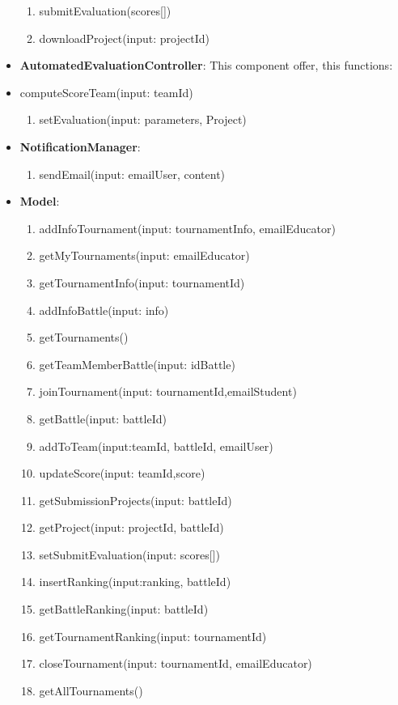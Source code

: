 \begin{itemize}
\begin{enumerate}
    \item submitEvaluation(scores[])
    \item downloadProject(input: projectId)
\end{enumerate}
\item \textbf{AutomatedEvaluationController}: This component offer,  this functions:
    \item computeScoreTeam(input: teamId)
\begin{enumerate}
    \item setEvaluation(input: parameters, Project)
\end{enumerate}
\item \textbf{NotificationManager}:
\begin{enumerate}
    \item sendEmail(input: emailUser, content)
\end{enumerate}
\item  \textbf{Model}:
\begin{enumerate}
    \item addInfoTournament(input: tournamentInfo, emailEducator)
    \item getMyTournaments(input: emailEducator)
    \item getTournamentInfo(input: tournamentId)
    \item addInfoBattle(input: info)
    \item getTournaments()
    \item getTeamMemberBattle(input: idBattle)
    \item joinTournament(input: tournamentId,emailStudent)
    \item getBattle(input: battleId)
    \item addToTeam(input:teamId, battleId, emailUser)
    \item updateScore(input: teamId,score)
    \item getSubmissionProjects(input: battleId)
    \item getProject(input: projectId, battleId)
    \item setSubmitEvaluation(input: scores[])
    \item insertRanking(input:ranking, battleId)
    \item getBattleRanking(input: battleId)
    \item getTournamentRanking(input: tournamentId)
    \item closeTournament(input: tournamentId, emailEducator)
    \item getAllTournaments()

\end{enumerate}
\end{itemize}
